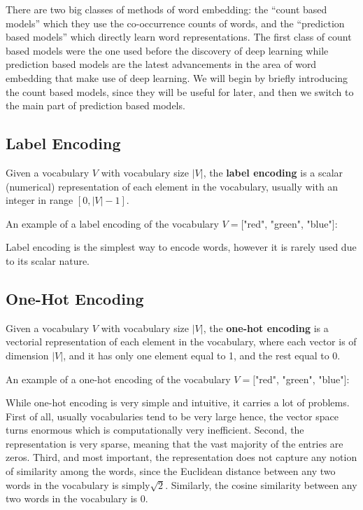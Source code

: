 There are two big classes of methods of word embedding: the ``count based models'' which they use the co-occurrence
counts of words, and the ``prediction based models'' which directly learn word representations. The first class of count
based models were the one used before the discovery of deep learning while prediction based models are the latest
advancements in the area of word embedding that make use of deep learning. We will begin by briefly introducing the
count based models, since they will be useful for later, and then we switch to the main part of prediction based models.

\subsection{Label Encoding}

Given a vocabulary $V$ with vocabulary size $|V|$, the \textbf{label encoding} is a scalar (numerical) representation
of each element in the vocabulary, usually with an integer in range $[0,|V|-1]$.
\ed

\be
An example of a label encoding of the vocabulary $V = [$"red", "green", "blue"$]$:

\ee

Label encoding is the simplest way to encode words, however it is rarely used due to its scalar nature.

\subsection{One-Hot Encoding}

Given a vocabulary $V$ with vocabulary size $|V|$, the \textbf{one-hot encoding} is a vectorial representation of each
element in the vocabulary, where each vector is of dimension $|V|$, and it has only one element equal to 1, and the
rest equal to 0.
\ed

\be
An example of a one-hot encoding of the vocabulary $V = [$"red", "green", "blue"$]$:
\ee

While one-hot encoding is very simple and intuitive, it carries a lot of problems. First of all, usually vocabularies
tend to be very large hence, the vector space turns enormous which is computationally very inefficient. Second, the
representation is very sparse, meaning that the vast majority of the entries are zeros. Third, and most important, the
representation does not capture any notion of similarity among the words, since the Euclidean distance between any two
words in the vocabulary is simply$\sqrt{2}$. Similarly, the cosine similarity between any two words in the vocabulary
is $0$.

